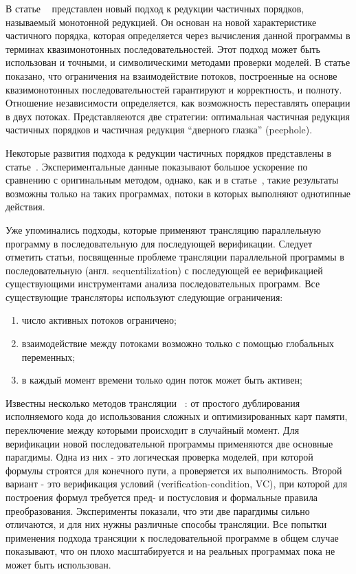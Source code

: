 В статье ~\cite{Kahlon:2009} представлен новый подход к редукции частичных порядков, называемый монотонной редукцией.
Он основан на новой характеристике частичного порядка, которая определяется через вычисления данной программы в терминах квазимонотонных последовательностей.
Этот подход может быть использован и точными, и символическими методами проверки моделей.
В статье показано, что ограничения на взаимодействие потоков, построенные на основе квазимонотонных последовательностей гарантируют и корректность, и полноту. 
Отношение независимости определяется, как возможность переставлять операции в двух потоках. Представляеются две стратегии: оптимальная частичная редукция частичных порядков и частичная редукция “дверного глазка” (peephole).

Некоторые развития подхода к редукции частичных порядков представлены в статье~\cite{Abdulla:2014}.
Экспериментальные данные показывают большое ускорение по сравнению с оригинальным методом, однако, как и в статье~\cite{Basler:2009}, такие результаты возможны только на таких программах, потоки в которых выполняют однотипные действия. 


Уже упоминались подходы, которые применяют трансляцию параллельную программу в последовательную для последующей верификации.
Следует отметить статьи, посвященные проблеме трансляции параллельной программы в последовательную (англ. sequentilization) с последующей ее верификацией существующими инструментами анализа последовательных программ.
Все существующие трансляторы используют следующие ограничения: 
\begin{enumerate}
\item число активных потоков ограничено;
\item взаимодействие между потоками возможно только с помощью глобальных переменных;
\item в каждый момент времени только один поток может быть активен;
\end{enumerate}
Известны несколько методов трансляции ~\cite{Torre:2009, Ghafari:2010,Inverso:2014, Tomasco:2015}: от простого дублирования исполняемого кода до использования сложных и оптимизированных карт памяти, переключение между которыми происходит в случайный момент.
Для верификации новой последовательной программы применяются две основные парагдимы. Одна из них - это логическая проверка моделей, при которой формулы строятся для конечного пути, а проверяется их выполнимость.
Второй вариант - это верификация условий (verification-condition, VC), при которой для построения формул требуется пред- и постусловия и формальные правила преобразования. Эксперименты показали, что эти две парагдимы сильно отличаются, и для них нужны различные способы трансляции. 
Все попытки применения подхода трансяции к последовательной программе в общем случае показывают, что он плохо масштабируется и на реальных программах пока не может быть использован. 

